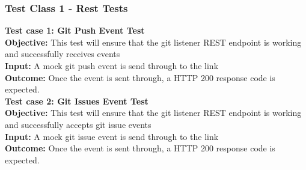 \documentclass[11pt,a4paper]{article}
\begin{document}
\subsubsection{Test Class 1 - Rest Tests}

\textbf{Test case 1: Git Push Event Test} \\
\textbf{Objective: } This test will ensure that the git listener REST endpoint is working and successfully receives events \\
\textbf{Input: } A mock git push event is send through to the link \\
\textbf{Outcome: } Once the event is sent through, a HTTP 200 response code is expected. \\

\textbf{Test case 2: Git Issues Event Test} \\
\textbf{Objective: } This test will ensure that the git listener REST endpoint is working and successfully accepts git issue events \\
\textbf{Input: } A mock git issue event is send through to the link \\
\textbf{Outcome: } Once the event is sent through, a HTTP 200 response code is expected. \\
\end{document}
